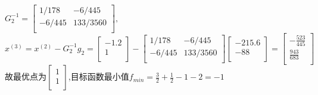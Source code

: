 \begin{solution}
    $G_2^{-1}=\begin{bmatrix}
        1/178 & -6/445\\
        -6/445 & 133/3560\\
    \end{bmatrix},$\\
    $x^{(3)}=x^{(2)}-G_2^{-1}g_2=\begin{bmatrix} -1.2\\1\\\end{bmatrix}-\begin{bmatrix}
        1/178 & -6/445\\
        -6/445 & 133/3560\\
    \end{bmatrix}\begin{bmatrix} -215.6\\-88\\\end{bmatrix}=\begin{bmatrix} -\frac{523}{445}\\\frac{943}{683}\\\end{bmatrix}$\\
    故最优点为$\begin{bmatrix} 1\\1\\\end{bmatrix}$,目标函数最小值$f_{min}=\frac{3}{2}+\frac{1}{2}-1-2=-1$
\end{solution}